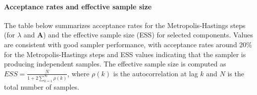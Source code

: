 \paragraph{Acceptance rates and effective sample size} The table below summarizes acceptance rates for the Metropolis-Hastings steps (for $\lambda$ and $\mathbf{A}$) and the effective sample size (ESS) for selected components. Values are consistent with good sampler performance, with acceptance rates around 20\% for the Metropolis-Hastings steps and ESS values indicating that the sampler is producing independent samples. The effective sample size is computed as $ESS = \frac{N}{1 + 2\sum_{k=1}^{\infty} \rho(k)}$, where $\rho(k)$ is the autocorrelation at lag $k$ and $N$ is the total number of samples.

